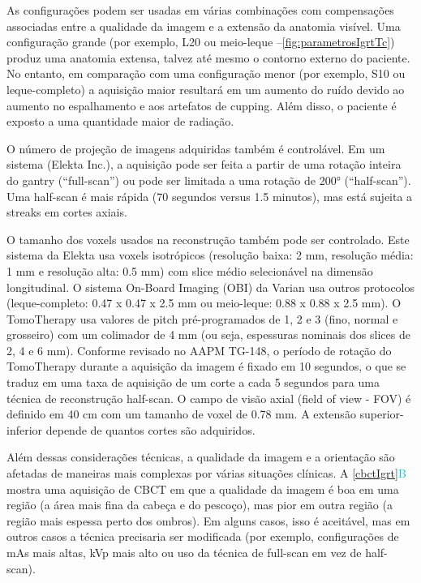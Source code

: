 \documentclass[11pt,a4paper]{article}
\newcounter{exemplo}
\begin{document}
	As configurações podem ser usadas em várias combinações com compensações associadas entre a qualidade da imagem e a extensão da anatomia visível. Uma configuração grande (por exemplo, L20 ou meio-leque --\ref{fig:parametrosIgrtTc}) produz uma anatomia extensa, talvez até mesmo o contorno externo do paciente. No entanto, em comparação com uma configuração menor (por exemplo, S10 ou leque-completo) a aquisição maior resultará em um aumento do ruído devido ao aumento no espalhamento e aos artefatos de cupping.  Além disso, o paciente é exposto a uma quantidade maior de radiação.

	O número de projeção de imagens adquiridas também é controlável. Em um sistema (Elekta Inc.), a aquisição pode ser feita a partir de uma rotação inteira do gantry (“full-scan”) ou pode ser limitada a uma rotação de \ang{200} (“half-scan”). Uma half-scan é mais rápida (70 segundos versus 1.5 minutos), mas está sujeita a streaks em cortes axiais. 

	O tamanho dos voxels usados na reconstrução também pode ser controlado. Este sistema da Elekta usa voxels isotrópicos (resolução baixa: 2 mm, resolução média: 1 mm e resolução alta: 0.5 mm) com slice médio selecionável na dimensão longitudinal. O sistema On-Board Imaging (OBI) da Varian usa outros protocolos (leque-completo: 0.47 x 0.47 x 2.5 mm ou meio-leque: 0.88 x 0.88 x 2.5 mm). O TomoTherapy usa valores de pitch pré-programados de 1, 2 e 3 (fino, normal e grosseiro) com um colimador de 4 mm (ou seja, espessuras nominais dos slices de 2, 4 e 6 mm). Conforme revisado no AAPM TG-148, o período de rotação do TomoTherapy durante a aquisição da imagem é fixado em 10 segundos, o que se traduz em uma taxa de aquisição de um corte a cada 5 segundos para uma técnica de reconstrução half-scan. O campo de visão axial (field of view - FOV) é definido em 40 cm com um tamanho de voxel de 0.78 mm. A extensão superior-inferior depende de quantos cortes são adquiridos. 

	Além dessas considerações técnicas, a qualidade da imagem e a orientação são afetadas de maneiras mais complexas por várias situações clínicas. A \ref{cbctIgrt}\textcolor{DarkTurquoise}{B} mostra uma aquisição de CBCT em que a qualidade da imagem é boa em uma região (a área mais fina da cabeça e do pescoço), mas pior em outra região (a região mais espessa perto dos ombros). Em alguns casos, isso é aceitável, mas em outros casos a técnica precisaria ser modificada (por exemplo, configurações de mAs mais altas, kVp mais alto ou uso da técnica de full-scan em vez de  half-scan).
\end{document}
